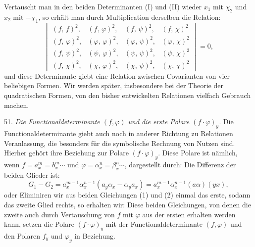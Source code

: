 
Vertauscht man in den beiden Determinanten (I) und (II) wieder $x_1$ mit $\chi_2$ und $x_2$ mit $-\chi_1$, so erhält man durch Multiplication derselben die Relation:
\[
\begin{vmatrix}
(f,\,f)^2, & (f,\,\varphi)^2, & (f,\,\psi)^2, & (f,\,\chi)^2 \\
(f,\,\varphi)^2, & (\varphi,\,\varphi)^2, & (\varphi,\,\psi)^2, & (\varphi,\,\chi)^2 \\
(f,\,\psi)^2, & (\psi,\,\varphi)^2, & (\psi,\,\psi)^2, & (\psi,\,\chi)^2 \\
(f,\,\chi)^2, & (\chi,\,\varphi)^2, & (\chi,\,\psi)^2, & (\chi,\,\chi)^2
\end{vmatrix} = 0,
\]
und diese Determinante giebt eine Relation zwischen Covarianten von vier beliebigen Formen. Wir werden später, insbesondere bei der Theorie der quadratischen Formen, von den bisher entwickelten Relationen vielfach Gebrauch machen.

51. \textit{Die Functionaldeterminante $(f, \varphi)$ und die erste Polare $(f\cdot\varphi)_y$.} Die Functionaldeterminante giebt auch noch in anderer Richtung zu Relationen Veranlassung, die besonders für die symbolische Rechnung von Nutzen sind. Hierher gehört ihre Beziehung zur Polare $(f\cdot\varphi)_y$. Diese Polare ist nämlich, wenn $f = a_x^m = b_x^m\cdots$ und $\varphi = \alpha_x^n = \beta_x^n\cdots$, dargestellt durch:
Die Differenz der beiden Glieder ist:
\[
G_1 - G_2 = a_x^{m-1}\alpha_x^{n-1}(a_y\alpha_x - \alpha_ya_x) = a_x^{m-1}\alpha_x^{n-1}(a\alpha)(yx),
\]
oder
Eliminiren wir aus beiden Gleichungen (1) und (2) einmal das erste, sodann das zweite Glied rechts, so erhalten wir:
Diese beiden Gleichungen, von denen die zweite auch durch Vertauschung von $f$ mit $\varphi$ aus der ersten erhalten werden kann, setzen die Polare $(f\cdot\varphi)_y$ mit der Functionaldeterminante $(f,\varphi)$ und den Polaren $f_y$ und $\varphi_y$ in Beziehung.

